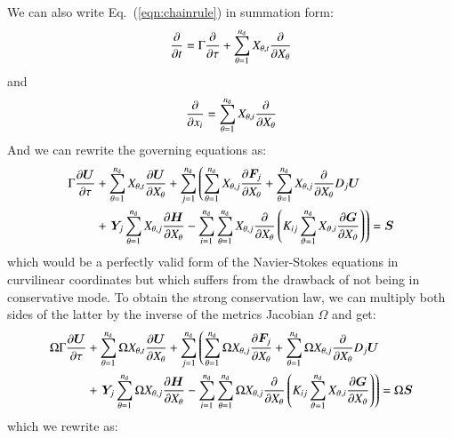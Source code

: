 \documentclass{warpdoc}
\newcommand{\alb}{\vspace{0.2cm}\\} %
\newcommand{\nd}{{{n}_{\rm d}}}
\renewcommand{\vec}[1]{\bm{#1}}
\begin{document}
We can also write Eq.\  (\ref{eqn:chainrule}) in summation form:
%
\begin{equation}
  \frac{\partial}{\partial t} = \Gamma \frac{\partial}{\partial \tau} +\sum_{\theta=1}^\nd X_{\theta,t} \frac{\partial}{\partial X_\theta}
\end{equation}
%
and
%
\begin{equation}
  \frac{\partial}{\partial x_i} = \sum_{\theta=1}^\nd X_{\theta,i}\frac{\partial}{\partial X_\theta}
\end{equation}
%
And we can rewrite the governing equations  as:
%
\begin{align}
\Gamma \frac{\partial \vec{U}}{\partial \tau} 
 &+\sum_{\theta=1}^\nd X_{\theta,t} \frac{\partial \vec{U}}{\partial X_\theta}
 + \sum_{j=1}^\nd \left( \sum_{\theta=1}^\nd X_{\theta,j}\frac{\partial \vec{F}_j}{\partial X_\theta}
 +  \sum_{\theta=1}^\nd X_{\theta,j}\frac{\partial }{\partial X_\theta}D_j\vec{U} \right.\nonumber\alb
 &+\left.  \vec{Y}_j  \sum_{\theta=1}^\nd X_{\theta,j}\frac{\partial \vec{H}}{\partial X_\theta}
 - \sum_{i=1}^\nd \sum_{\theta=1}^\nd X_{\theta,j}\frac{\partial}{\partial X_\theta}
     \left( K_{ij} \sum_{\vartheta=1}^\nd X_{\vartheta,i}\frac{\partial \vec{G}}{\partial X_\vartheta} \right)\right)
 = \vec{S}
 \label{eqn:goveq2}
\end{align}
%
which would be a perfectly valid form of the Navier-Stokes
equations  in curvilinear coordinates but which suffers from
the drawback of not being in conservative mode. To obtain the
strong conservation law, we can multiply both sides of the latter
by the inverse of the metrics Jacobian $\Omega$ and get:
%
\begin{align}
\Omega\Gamma \frac{\partial \vec{U}}{\partial \tau} 
 &+\sum_{\theta=1}^\nd \Omega X_{\theta,t} \frac{\partial \vec{U}}{\partial X_\theta}
 + \sum_{j=1}^\nd \left( \sum_{\theta=1}^\nd \Omega X_{\theta,j}\frac{\partial \vec{F}_j}{\partial X_\theta}
 +  \sum_{\theta=1}^\nd \Omega X_{\theta,j}\frac{\partial }{\partial X_\theta}D_j\vec{U} \right.\nonumber\alb
 &+\left.  \vec{Y}_j  \sum_{\theta=1}^\nd \Omega X_{\theta,j}\frac{\partial \vec{H}}{\partial X_\theta}
 - \sum_{i=1}^\nd \sum_{\theta=1}^\nd \Omega X_{\theta,j}\frac{\partial}{\partial X_\theta}
     \left( K_{ij} \sum_{\vartheta=1}^\nd X_{\vartheta,i}\frac{\partial \vec{G}}{\partial X_\vartheta} \right)\right)
 = \Omega \vec{S}
 \label{eqn:goveq3}
\end{align}
%
which we rewrite as:
%
\end{document}
